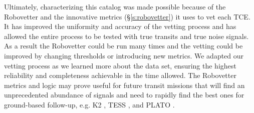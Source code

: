 Ultimately, characterizing this catalog was made possible because of the Robovetter and the innovative metrics (\S\ref{s:robovetter}) it uses to vet each TCE. It has improved the uniformity and accuracy of the vetting process and has allowed the entire process to be tested with true transits and true noise signals. As a result the Robovetter could be run many times and the vetting could be improved by changing thresholds or introducing new metrics. We adapted our vetting process as we learned more about the data set, ensuring the highest reliability and completeness achievable in the time allowed.  The Robovetter metrics and logic may prove useful for future transit missions that will find an unprecedented abundance of signals and need to rapidly find the best ones for ground-based follow-up, e.g. K2 \citep{Howell2014}, TESS \citep{Ricker2015}, and PLATO \citep{Rauer2016}. 


